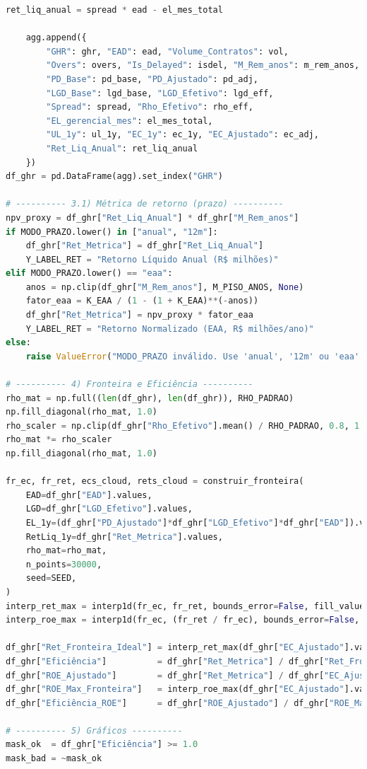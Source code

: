 \documentclass[11pt,a4paper]{article}
\newcommand{\1}{\mathbf{1}}
\begin{document}
\begin{lstlisting}[language=Python, caption={risk_frontier.py (versão completa com normalização por prazo e visões)}]
    ret_liq_anual = spread * ead - el_mes_total

    agg.append({
        "GHR": ghr, "EAD": ead, "Volume_Contratos": vol,
        "Overs": overs, "Is_Delayed": isdel, "M_Rem_anos": m_rem_anos,
        "PD_Base": pd_base, "PD_Ajustado": pd_adj,
        "LGD_Base": lgd_base, "LGD_Efetivo": lgd_eff,
        "Spread": spread, "Rho_Efetivo": rho_eff,
        "EL_gerencial_mes": el_mes_total,
        "UL_1y": ul_1y, "EC_1y": ec_1y, "EC_Ajustado": ec_adj,
        "Ret_Liq_Anual": ret_liq_anual
    })
df_ghr = pd.DataFrame(agg).set_index("GHR")

# ---------- 3.1) Métrica de retorno (prazo) ----------
npv_proxy = df_ghr["Ret_Liq_Anual"] * df_ghr["M_Rem_anos"]
if MODO_PRAZO.lower() in ["anual", "12m"]:
    df_ghr["Ret_Metrica"] = df_ghr["Ret_Liq_Anual"]
    Y_LABEL_RET = "Retorno Líquido Anual (R$ milhões)"
elif MODO_PRAZO.lower() == "eaa":
    anos = np.clip(df_ghr["M_Rem_anos"], M_PISO_ANOS, None)
    fator_eaa = K_EAA / (1 - (1 + K_EAA)**(-anos))
    df_ghr["Ret_Metrica"] = npv_proxy * fator_eaa
    Y_LABEL_RET = "Retorno Normalizado (EAA, R$ milhões/ano)"
else:
    raise ValueError("MODO_PRAZO inválido. Use 'anual', '12m' ou 'eaa'.")

# ---------- 4) Fronteira e Eficiência ----------
rho_mat = np.full((len(df_ghr), len(df_ghr)), RHO_PADRAO)
np.fill_diagonal(rho_mat, 1.0)
rho_scaler = np.clip(df_ghr["Rho_Efetivo"].mean() / RHO_PADRAO, 0.8, 1.5)
rho_mat *= rho_scaler
np.fill_diagonal(rho_mat, 1.0)

fr_ec, fr_ret, ecs_cloud, rets_cloud = construir_fronteira(
    EAD=df_ghr["EAD"].values,
    LGD=df_ghr["LGD_Efetivo"].values,
    EL_1y=(df_ghr["PD_Ajustado"]*df_ghr["LGD_Efetivo"]*df_ghr["EAD"]).values,
    RetLiq_1y=df_ghr["Ret_Metrica"].values,
    rho_mat=rho_mat,
    n_points=30000,
    seed=SEED,
)
interp_ret_max = interp1d(fr_ec, fr_ret, bounds_error=False, fill_value="extrapolate")
interp_roe_max = interp1d(fr_ec, (fr_ret / fr_ec), bounds_error=False, fill_value="extrapolate")

df_ghr["Ret_Fronteira_Ideal"] = interp_ret_max(df_ghr["EC_Ajustado"].values)
df_ghr["Eficiência"]          = df_ghr["Ret_Metrica"] / df_ghr["Ret_Fronteira_Ideal"]
df_ghr["ROE_Ajustado"]        = df_ghr["Ret_Metrica"] / df_ghr["EC_Ajustado"].replace(0, np.nan)
df_ghr["ROE_Max_Fronteira"]   = interp_roe_max(df_ghr["EC_Ajustado"].values)
df_ghr["Eficiência_ROE"]      = df_ghr["ROE_Ajustado"] / df_ghr["ROE_Max_Fronteira"]

# ---------- 5) Gráficos ----------
mask_ok  = df_ghr["Eficiência"] >= 1.0
mask_bad = ~mask_ok


\end{lstlisting}
\end{document}
